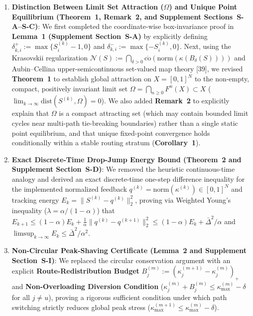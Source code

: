 \documentclass[11pt,a4paper]{article}
\begin{document}
\begin{enumerate}[leftmargin=1.8em]
    \item \textbf{Distinction Between Limit Set Attraction ($\Omega$) and Unique Point Equilibrium (Theorem~1, Remark~2, and Supplement Sections~S-A--S-C)}: We first completed the coordinate-wise box-invariance proof in \textbf{Lemma~1 (Supplement Section~S-A)} by explicitly defining $\delta^+_{k,i} := \max\{S_i^{(k)}-1, 0\}$ and $\delta^-_{k,i} := \max\{-S_i^{(k)}, 0\}$. Next, using the Krasovskii regularization $\mathcal{N}(S) := \bigcap_{\delta>0}\overline{\mathrm{co}}(\mathrm{norm}(\kappa(B_\delta(S))))$ and Aubin--Cellina upper-semicontinuous set-valued map theory [39], we revised \textbf{Theorem~1} to establish global attraction on $X=[0,1]^N$ to the non-empty, compact, positively invariant limit set $\Omega = \bigcap_{n\ge 0} F^n(X) \subset X$ ($\lim_{k\to\infty}\mathrm{dist}(S^{(k)}, \Omega)=0$). We also added \textbf{Remark~2} to explicitly explain that $\Omega$ is a compact attracting set (which may contain bounded limit cycles near multi-path tie-breaking boundaries) rather than a single static point equilibrium, and that unique fixed-point convergence holds conditionally within a stable routing stratum (\textbf{Corollary~1}).
    \item \textbf{Exact Discrete-Time Drop-Jump Energy Bound (Theorem~2 and Supplement Section~S-D)}: We removed the heuristic continuous-time analogy and derived an exact discrete-time one-step difference inequality for the implemented normalized feedback $q^{(k)} = \mathrm{norm}(\kappa^{(k)}) \in [0,1]^N$ and tracking energy $E_k = \|S^{(k)}-q^{(k)}\|_2^2$, proving via Weighted Young's inequality ($\lambda = \alpha/(1-\alpha)$) that $E_{k+1} \le (1-\alpha)E_k + \frac{1}{\alpha}\|q^{(k)}-q^{(k+1)}\|_2^2 \le (1-\alpha)E_k + \bar{\Delta}^2/\alpha$ and $\limsup_{k\to\infty} E_k \le \bar{\Delta}^2/\alpha^2$.
    \item \textbf{Non-Circular Peak-Shaving Certificate (Lemma~2 and Supplement Section~S-I)}: We replaced the circular conservation argument with an explicit \textbf{Route-Redistribution Budget} $B_j^{(m)} := (\kappa_j^{(m+1)}-\kappa_j^{(m)})_+$ and \textbf{Non-Overloading Diversion Condition} ($\kappa_j^{(m)} + B_j^{(m)} \le \kappa_{\max}^{(m)} - \delta$ for all $j \neq u$), proving a rigorous sufficient condition under which path switching strictly reduces global peak stress ($\kappa_{\max}^{(m+1)} \le \kappa_{\max}^{(m)} - \delta$).

\end{enumerate}
\end{document}

